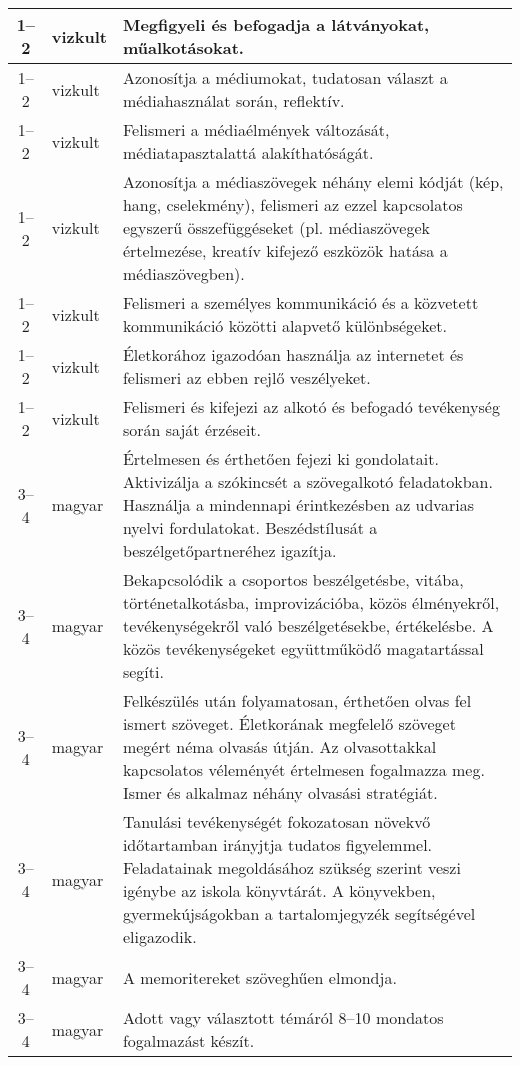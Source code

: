 \begin{small}
\begin{longtable}{c | p{2cm} |  p{11cm} }
              1--2 & vizkult & Megfigyeli és befogadja a látványokat, műalkotásokat. \\ \hline
              1--2 & vizkult & Azonosítja a médiumokat, tudatosan választ a médiahasználat során, reflektív. \\ \hline
              1--2 & vizkult & Felismeri a médiaélmények változását, médiatapasztalattá alakíthatóságát. \\ \hline
              1--2 & vizkult & Azonosítja a médiaszövegek néhány elemi kódját (kép, hang, cselekmény), felismeri az ezzel kapcsolatos egyszerű összefüggéseket (pl. médiaszövegek értelmezése, kreatív kifejező eszközök hatása a médiaszövegben). \\ \hline
              1--2 & vizkult & Felismeri a személyes kommunikáció és a közvetett kommunikáció közötti alapvető különbségeket. \\ \hline
              1--2 & vizkult & Életkorához igazodóan használja az internetet és felismeri az ebben rejlő veszélyeket. \\ \hline
              1--2 & vizkult & Felismeri és kifejezi az alkotó és befogadó tevékenység során saját érzéseit. \\ \hline
              3--4 & magyar & Értelmesen és érthetően fejezi ki gondolatait. Aktivizálja a szókincsét a szövegalkotó feladatokban. Használja a mindennapi érintkezésben az udvarias nyelvi fordulatokat. Beszédstílusát a beszélge\-tőpart\-neréhez igazítja. \\ \hline
              3--4 & magyar & Bekapcsolódik a csoportos beszélgetésbe, vitába, történetalkotásba, improvizációba, közös élményekről, tevékenységekről való beszélgetésekbe, értékelésbe. A közös tevékenységeket együttműködő magatartással segíti. \\ \hline
              3--4 & magyar & Felkészülés után folyamatosan, érthetően olvas fel ismert szöveget. Életkorának megfelelő szöveget megért néma olvasás útján. Az olvasottakkal kapcsolatos véleményét értelmesen fogalmazza meg. Ismer és alkalmaz néhány olvasási stratégiát. \\ \hline
              3--4 & magyar & Tanulási tevékenységét fokozatosan növekvő időtartamban irányjtja tudatos figyelemmel. Feladatainak megoldásához szükség szerint veszi igénybe az iskola könyvtárát. A könyvekben, gyermekújságokban a tartalomjegyzék segítségével eligazodik. \\ \hline
              3--4 & magyar & A memoritereket szöveghűen elmondja. \\ \hline
              3--4 & magyar & Adott vagy választott témáról 8–10 mondatos fogalmazást készít. \\ \hline

\end{longtable}
\end{small}
